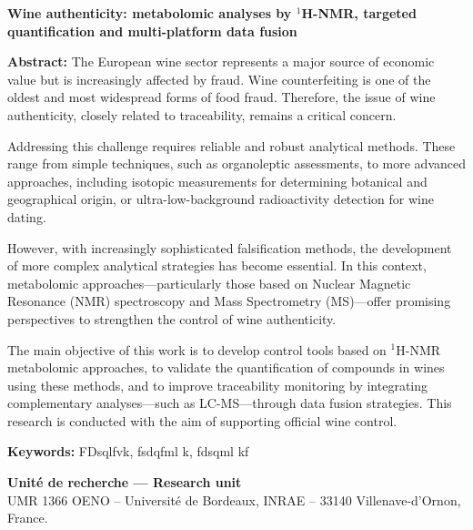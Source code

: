 \begin{small}
{%



\begin{center}
\textbf{Wine authenticity: metabolomic analyses by $^1$H-NMR, targeted quantification and multi-platform data fusion}
\end{center}

\noindent\textbf{Abstract:} 
The European wine sector represents a major source of economic value but is increasingly affected by fraud. Wine counterfeiting is one of the oldest and most widespread forms of food fraud. Therefore, the issue of wine authenticity, closely related to traceability, remains a critical concern.

Addressing this challenge requires reliable and robust analytical methods. These range from simple techniques, such as organoleptic assessments, to more advanced approaches, including isotopic measurements for determining botanical and geographical origin, or ultra-low-background radioactivity detection for wine dating.

However, with increasingly sophisticated falsification methods, the development of more complex analytical strategies has become essential. In this context, metabolomic approaches—particularly those based on Nuclear Magnetic Resonance (NMR) spectroscopy and Mass Spectrometry (MS)—offer promising perspectives to strengthen the control of wine authenticity.

The main objective of this work is to develop control tools based on $^1$H-NMR metabolomic approaches, to validate the quantification of compounds in wines using these methods, and to improve traceability monitoring by integrating complementary analyses—such as LC-MS—through data fusion strategies. This research is conducted with the aim of supporting official wine control.

\vspace{0.8\baselineskip} %
\noindent\textbf{Keywords:} FDsqlfvk, fsdqfml k,  fdsqml kf %

\vspace{0.4cm}
\noindent\makebox[\linewidth]{\rule{\textwidth}{0.4pt}}

\vfill
\begin{center}
\textbf{Unité de recherche --- Research unit} \\
UMR 1366 OENO -- Université de Bordeaux, INRAE -- 33140 Villenave-d'Ornon, France.
\end{center}
}
\end{small}

\cleardoublepage                     %